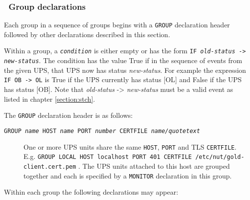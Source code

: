 \documentclass[12pt]{article}
\newlength{\headersep}\setlength{\headersep}{3mm}
\newcommand{\Hsep}{\hspace{\headersep}}
\newcommand{\status}[1]{\textcolor{UPSDCOLOUR}{[{#1}]}}
\begin{document}
\subsubsection{\Hsep\ Group declarations}\label{section:grpdecl}

Each group in a sequence of groups begins with a \texttt{GROUP}
declaration header followed by other declarations described in this
section.

Within a group, a \texttt{\textit{condition}} is either empty or has
the form \texttt{IF \textit{old-status} -> \textit{new-status}}. The
condition has the value True if in the sequence of events from the
given UPS, that UPS now has status \textit{new-status}.  For example
the expression \texttt{IF OB -> OL} is True if the UPS currently has
status \status{OL} and False if the UPS has status \status{OB}.  Note
that \textit{old-status} -> \textit{new-status} must be a valid event
as listed in chapter \ref{section:stch}.

The \texttt{GROUP} declaration header is as follows:

\begin{description}

\item[\texttt{GROUP \textit{name} HOST \textit{name} PORT
    \textit{number} CERTFILE \textit{name/quotetext}}] \hspace{7mm}
  One or more UPS units share the same \texttt{HOST}, \texttt{PORT}
  and TLS \texttt{CERTFILE}.  E.g.  \texttt{GROUP LOCAL HOST localhost
    PORT 401 CERTFILE /etc/nut/gold-client.cert.pem} . The UPS units
  attached to this host are grouped together and each is specified by
  a \texttt{MONITOR} declaration in this group.

\end{description}

Within each group the following declarations may appear:
\end{document}

